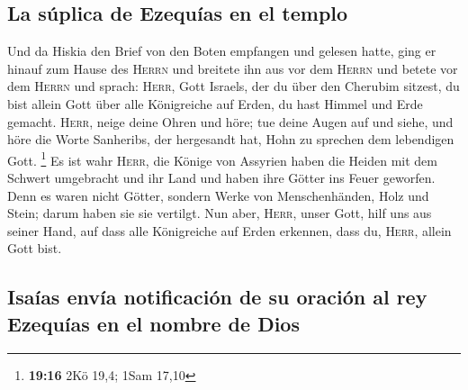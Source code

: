 \hypertarget{la-suxfaplica-de-ezequuxedas-en-el-templo}{%
\subsection{La súplica de Ezequías en el
templo}\label{la-suxfaplica-de-ezequuxedas-en-el-templo}}

 Und da Hiskia den Brief von den Boten empfangen und
gelesen hatte, ging er hinauf zum Hause des \textsc{Herrn} und breitete
ihn aus vor dem \textsc{Herrn}  und betete vor dem
\textsc{Herrn} und sprach: \textsc{Herr}, Gott Israels, der du über den
Cherubim sitzest, du bist allein Gott über alle Königreiche auf Erden,
du hast Himmel und Erde gemacht.  \textsc{Herr}, neige
deine Ohren und höre; tue deine Augen auf und siehe, und höre die Worte
Sanheribs, der hergesandt hat, Hohn zu sprechen dem lebendigen Gott.
\footnote{\textbf{19:16} 2Kö 19,4; 1Sam 17,10}  Es ist
wahr \textsc{Herr}, die Könige von Assyrien haben die Heiden mit dem
Schwert umgebracht und ihr Land  und haben ihre Götter
ins Feuer geworfen. Denn es waren nicht Götter, sondern Werke von
Menschenhänden, Holz und Stein; darum haben sie sie vertilgt.
 Nun aber, \textsc{Herr}, unser Gott, hilf uns aus seiner
Hand, auf dass alle Königreiche auf Erden erkennen, dass du,
\textsc{Herr}, allein Gott bist.

\hypertarget{isauxedas-envuxeda-notificaciuxf3n-de-su-oraciuxf3n-al-rey-ezequuxedas-en-el-nombre-de-dios}{%
\subsection{Isaías envía notificación de su oración al rey Ezequías en
el nombre de
Dios}\label{isauxedas-envuxeda-notificaciuxf3n-de-su-oraciuxf3n-al-rey-ezequuxedas-en-el-nombre-de-dios}}

